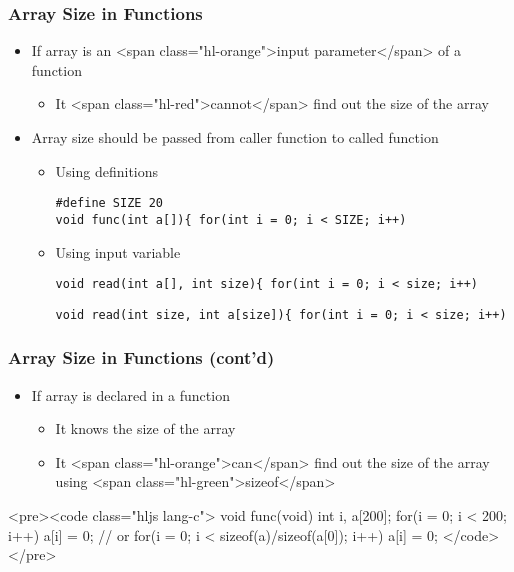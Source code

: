 \documentclass{../c-lecture}
\begin{document}
\begin{frame}
  \begin{frame}
    \frametitle{Array Size in Functions}
    \begin{itemize}
      \item
        If array is an <span class="hl-orange">input parameter</span> of a
        function

      \begin{itemize}
        \item
          It <span class="hl-red">cannot</span> find out the size of the array

      \end{itemize}
    \end{itemize}
  \end{frame}
  \begin{frame}
    \begin{itemize}
      \item
        Array size should be passed from caller function to called function

      \begin{itemize}
        \item Using definitions
        \begin{verbatim}
#define SIZE 20
void func(int a[]){ for(int i = 0; i < SIZE; i++)
        \end{verbatim}
        \item Using input variable
        \begin{verbatim}
void read(int a[], int size){ for(int i = 0; i < size; i++)
        \end{verbatim}
        \begin{verbatim}
void read(int size, int a[size]){ for(int i = 0; i < size; i++)
        \end{verbatim}
      \end{itemize}
    \end{itemize}
  \end{frame}
\end{frame}
\begin{frame}
  \frametitle{Array Size in Functions (cont’d)}
  \begin{itemize}
    \item If array is declared in a function
    \begin{itemize}
      \item It knows the size of the array
      \item
        It <span class="hl-orange">can</span> find out the size of the array
        using <span class="hl-green">sizeof</span>

    \end{itemize}
  \end{itemize}
  <pre><code class="hljs lang-c">
void func(void){
  int i, a[200];
  for(i = 0; i < 200; i++)
    a[i] = 0;
  // or
  for(i = 0; i < sizeof(a)/sizeof(a[0]); i++)
    a[i] = 0;
}
  </code></pre>
\end{frame}
\end{document}
